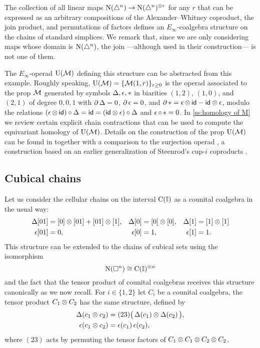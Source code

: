 The collection of all linear maps $\operatorname{N}(\triangle^n) \to \operatorname{N}(\triangle^n)^{\otimes r}$ for any $r$ that can be expressed as an arbitrary compositions of the Alexander--Whitney coproduct, the join product, and permutations of factors defines an $E_\infty$-coalgebra structure on the chains of standard simplices.
We remark that, since we are only considering maps whose domain is $\operatorname{N}(\triangle^n)$, the join ---although used in their construction--- is not one of them.

The $E_\infty$-operad ${\operatorname{U}(\mathcal{M})}$ defining this structure can be abstracted from this example.
Roughly speaking, ${\operatorname{U}(\mathcal{M})} = \{\mathcal{M}(1,r)\}_{r \geq 0}$ is the operad associated to the prop $\mathcal{M}$ generated by symbols $\operatorname{\Delta}, \operatorname{\epsilon}, \operatorname{\ast}$ in biarities $(1,2)$, $(1,0)$, and $(2,1)$ of degree $0,0,1$ with $\partial \operatorname{\Delta} = 0$, $\partial \operatorname{\epsilon} = 0$, and $\partial \operatorname{\ast} = \operatorname{\epsilon} \otimes \, \mathsf{id} - \mathsf{id} \otimes \operatorname{\epsilon}$, modulo the relations $(\operatorname{\epsilon} \otimes \, \mathsf{id}) \circ \operatorname{\Delta} = \mathsf{id} = (\mathsf{id} \otimes \operatorname{\epsilon}) \circ \operatorname{\Delta}$ and $\operatorname{\epsilon} \circ \, \ast = 0$.
In \cref{ss:homology of M} we review certain explicit chain contractions that can be used to compute the equivariant homology of ${\operatorname{U}(\mathcal{M})}$.
Details on the construction of the prop ${\operatorname{U}(\mathcal{M})}$ can be found in \cite{medina2020prop1} together with a comparison to the surjection operad \cite{mcclure2003multivariable}, a construction based on an earlier generalization of Steenrod's cup-$i$ coproducts \cite[\S4.5]{benson1998representations}.

\subsection{Cubical chains}

Let us consider the cellular chains on the interval $\operatorname{C}(\mathbb{I})$ as a counital coalgebra in the usual way:
\begin{align*}
\operatorname{\Delta}[01] &= [0] \otimes [01] + [01] \otimes [1], &
\operatorname{\Delta}[0]  &= [0] \otimes [0], &
\operatorname{\Delta}[1]  &= [1] \otimes [1] \\
\operatorname{\epsilon}[01] &= 0, &
\operatorname{\epsilon}[0]  &= 1, &
\operatorname{\epsilon} [1]  &= 1.
\end{align*}
This structure can be extended to the chains of cubical sets using the isomorphism
\[
\operatorname{N}(\square^n) \cong \operatorname{C}(\mathbb{I})^{\otimes n}
\]
and the fact that the tensor product of counital coalgebras receives this structure canonically as we now recall.
For $i \in \{1,2\}$ let $C_i$ be a counital coalgebra, the tensor product $C_1 \otimes C_2$ has the same structure, defined by
\begin{align} \label{e:extension of coproduct}
\operatorname{\Delta}(c_1 \otimes c_2) &= (23) \big( \operatorname{\Delta}(c_1) \otimes \operatorname{\Delta}(c_2) \, \big), \\
\label{e:extension of augmentation}
\operatorname{\epsilon}(c_1 \otimes c_2) &= \operatorname{\epsilon}(c_1) \operatorname{\epsilon}(c_2),
\end{align}
where $(23)$ acts by permuting the tensor factors of $C_1 \otimes C_1 \otimes C_2 \otimes C_2$.

